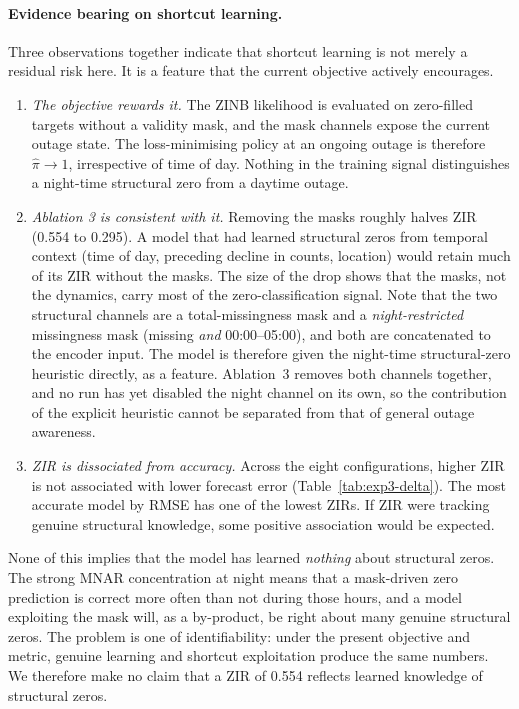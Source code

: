 \paragraph{Evidence bearing on shortcut learning.}
Three observations together indicate that shortcut learning is not
merely a residual risk here. It is a feature that the current objective
actively encourages.

\begin{enumerate}
    \item \emph{The objective rewards it.} The ZINB likelihood is
    evaluated on zero-filled targets without a validity mask, and the
    mask channels expose the current outage state. The loss-minimising
    policy at an ongoing outage is therefore $\hat{\pi} \to 1$,
    irrespective of time of day. Nothing in the training signal
    distinguishes a night-time structural zero from a daytime outage.
    \item \emph{Ablation 3 is consistent with it.} Removing the masks
    roughly halves ZIR (0.554 to 0.295). A model that had learned
    structural zeros from temporal context (time of day, preceding
    decline in counts, location) would retain much of its ZIR without
    the masks. The size of the drop shows that the masks, not the
    dynamics, carry most of the zero-classification signal. Note that
    the two structural channels are a total-missingness mask and a
    \emph{night-restricted} missingness mask (missing \emph{and}
    00:00--05:00), and both are concatenated to the encoder input. The
    model is therefore given the night-time structural-zero heuristic
    directly, as a feature. Ablation~3 removes both channels together,
    and no run has yet disabled the night channel on its own, so the
    contribution of the explicit heuristic cannot be separated from
    that of general outage awareness.
    \item \emph{ZIR is dissociated from accuracy.} Across the
    eight configurations, higher ZIR is not associated with
    lower forecast error (Table~\ref{tab:exp3-delta}). The most accurate
    model by RMSE has one of the lowest ZIRs. If ZIR were tracking
    genuine structural knowledge, some positive association would be
    expected.
\end{enumerate}

None of this implies that the model has learned \emph{nothing} about
structural zeros. The strong MNAR concentration at night means that a
mask-driven zero prediction is correct more often than not during those
hours, and a model exploiting the mask will, as a by-product, be right
about many genuine structural zeros. The problem is one of
identifiability: under the present objective and metric, genuine
learning and shortcut exploitation produce the same numbers. We
therefore make no claim that a ZIR of 0.554 reflects learned
knowledge of structural zeros.

